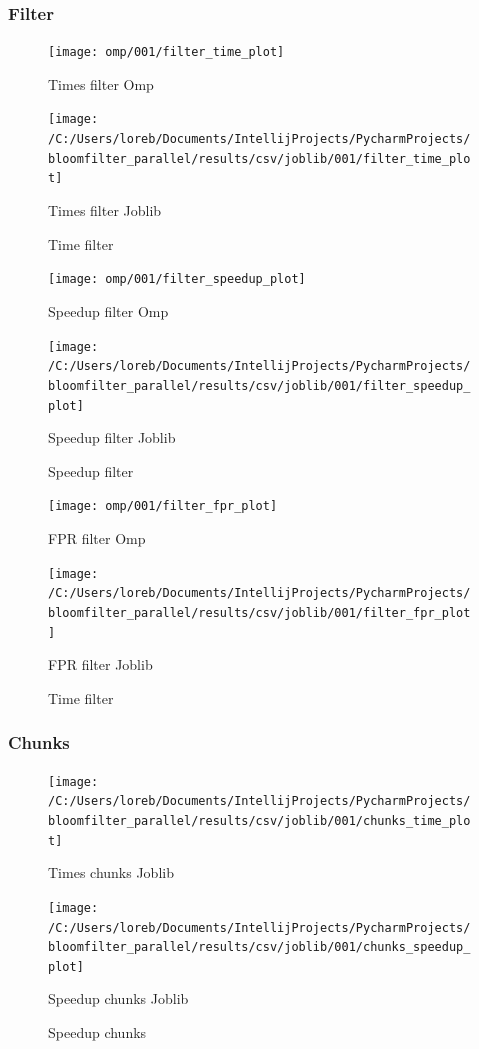 \documentclass[11pt]{article}
\begin{document}
    \subsubsection{Filter}\label{subsubsec:filter}
    \begin{figure}[H]
        \centering
        \texttt{[image: omp/001/filter\_time\_plot]}
            \caption{Times filter Omp}\label{fig:filter_time_omp}
        \endminipage\hfill
        \texttt{[image: /C:/Users/loreb/Documents/IntellijProjects/PycharmProjects/bloomfilter\_parallel/results/csv/joblib/001/filter\_time\_plot]}
            \caption{Times filter Joblib}\label{fig:filter_time_joblib}
        \endminipage\hfill
        \caption{Time filter}
    \end{figure}
    \begin{figure}[H]
        \centering
        \texttt{[image: omp/001/filter\_speedup\_plot]}
            \caption{Speedup filter Omp}\label{fig:filter_speedup_omp}
        \endminipage\hfill
        \texttt{[image: /C:/Users/loreb/Documents/IntellijProjects/PycharmProjects/bloomfilter\_parallel/results/csv/joblib/001/filter\_speedup\_plot]}
            \caption{Speedup filter Joblib}\label{fig:filter_speedup_joblib}
        \endminipage\hfill
        \caption{Speedup filter}
    \end{figure}
    \begin{figure}[H]
        \centering
        \texttt{[image: omp/001/filter\_fpr\_plot]}
            \caption{FPR filter Omp}\label{fig:filter_fpr_omp}
        \endminipage\hfill
        \texttt{[image: /C:/Users/loreb/Documents/IntellijProjects/PycharmProjects/bloomfilter\_parallel/results/csv/joblib/001/filter\_fpr\_plot]}
            \caption{FPR filter Joblib}\label{fig:filter_fpr_joblib}
        \endminipage\hfill
        \caption{Time filter}
    \end{figure}

    \subsubsection{Chunks}\label{subsubsec:chunks}
    \begin{figure}[H]
        \centering
        \texttt{[image: /C:/Users/loreb/Documents/IntellijProjects/PycharmProjects/bloomfilter\_parallel/results/csv/joblib/001/chunks\_time\_plot]}
            \caption{Times chunks Joblib}\label{fig:chunks_time_joblib}
        \endminipage\hfill
        \texttt{[image: /C:/Users/loreb/Documents/IntellijProjects/PycharmProjects/bloomfilter\_parallel/results/csv/joblib/001/chunks\_speedup\_plot]}
            \caption{Speedup chunks Joblib}\label{fig:chunks_speedup_joblib}
        \endminipage\hfill
        \caption{Speedup chunks}
    \end{figure}
\end{document}
